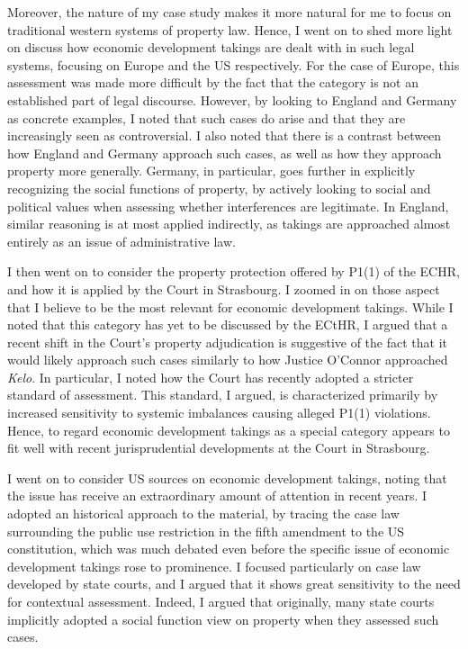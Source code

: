 \documentclass[12pt,a4paper]{book} %
\begin{document}
Moreover, the nature of my case study makes it more natural for me to focus on traditional western systems of property law. Hence, I went on to shed more light on discuss how economic development takings are dealt with in such legal systems, focusing on Europe and the US respectively. For the case of Europe, this assessment was made more difficult by the fact that the category is not an established part of legal discourse. However, by looking to England and Germany as concrete examples, I noted that such cases do arise and that they are increasingly seen as controversial. I also noted that there is a contrast between how England and Germany approach such cases, as well as how they approach property more generally. Germany, in particular, goes further in explicitly recognizing the social functions of property, by actively looking to social and political values when assessing whether interferences are legitimate. In England, similar reasoning is at most applied indirectly, as takings are approached almost entirely as an issue of administrative law. 

I then went on to consider the property protection offered by P1(1) of the ECHR, and how it is applied by the Court in Strasbourg. I zoomed in on those aspect that I believe to be the most relevant for economic development takings. While I noted that this category has yet to be discussed by the ECtHR, I argued that a recent shift in the Court's property adjudication is suggestive of the fact that it would likely approach such cases similarly to how Justice O'Connor approached {\it Kelo}. In particular, I noted how the Court has recently adopted a stricter standard of assessment. This standard, I argued, is characterized primarily by increased sensitivity to systemic imbalances causing alleged P1(1) violations. Hence, to regard economic development takings as a special category appears to fit well with recent jurisprudential developments at the Court in Strasbourg.

I went on to consider US sources on economic development takings, noting that the issue has receive an extraordinary amount of attention in recent years. I adopted an historical approach to the material, by tracing the case law surrounding the public use restriction in the fifth amendment to the US constitution, which was much debated even before the specific issue of economic development takings rose to prominence. I focused particularly on case law developed by state courts, and I argued that it shows great sensitivity to the need for contextual assessment. Indeed, I argued that originally, many state courts implicitly adopted a social function view on property when they assessed such cases.
\end{document}
